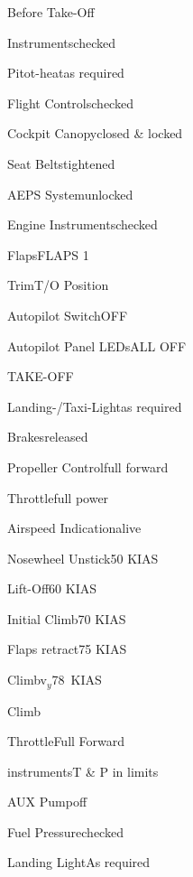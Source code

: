 \begin{checklist}{Before Take-Off}
  \item{Instruments}{checked}
  \item{Pitot-heat}{as required}
  \item{Flight Controls}{checked}
  \item{Cockpit Canopy}{closed \& locked}
  \item{Seat Belts}{tightened}
  \item{AEPS System}{unlocked}
  \item{Engine Instruments}{checked}
  \item{Flaps}{FLAPS 1}
  \item{Trim}{T/O Position}
  \item{Autopilot Switch}{OFF}
  \item{Autopilot Panel LEDs}{ALL OFF}
\end{checklist}

\begin{checklist}{TAKE-OFF}
  \item{Landing-/Taxi-Light}{as required}
  \item{Brakes}{released}
  \item{Propeller Control}{full forward}
  \item{Throttle}{full power}
  \item{Airspeed Indication}{alive}
  \item{Nosewheel Unstick}{50 KIAS}
  \item{Lift-Off}{60 KIAS}
  \item{Initial Climb}{70 KIAS}
  \item{Flaps retract}{75 KIAS}
  \item{Climb}{v$_{y}$78~KIAS} 
\end{checklist}

\begin{checklist}{Climb}
  \item{Throttle}{Full Forward}
  \item{instruments}{T \& P in limits}
  \item{AUX Pump}{off}
  \item{Fuel Pressure}{checked}
  \item{Landing Light}{As required}
\end{checklist}

